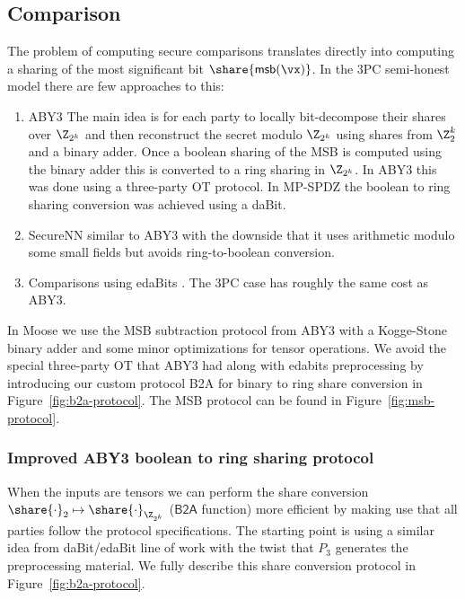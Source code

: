 \subsection{Comparison}


The problem of computing secure comparisons translates directly into computing a sharing of the most significant bit $\share{\mathsf{msb}(\vx)}$.
In the 3PC semi-honest model there are few approaches to this:
\begin{enumerate}
   \item ABY3 \cite{CCS:MohRin18} The main idea is for
   each party to locally bit-decompose their shares over $\Z_{2^k}$ and then
   reconstruct the secret modulo $\Z_{2^k}$ using shares from $\Z^k_2$ and a
   binary adder. Once a boolean sharing of the MSB is computed using the binary adder
   this is converted to a ring sharing in $\Z_{2^k}$.
   In ABY3 this was done using a three-party OT protocol. In MP-SPDZ \cite{CCS:Keller20} 
   the boolean to ring sharing conversion was achieved using a daBit.
   \item SecureNN \cite{PoPETS:WagGupCha19} 
   similar to ABY3 with the downside that it uses arithmetic modulo
   some small fields but avoids ring-to-boolean conversion.
  \item Comparisons using edaBits \cite{C:EGKRS20}. The 3PC case has roughly the same cost as ABY3.
\end{enumerate}

In Moose we use the MSB subtraction protocol from ABY3 with a Kogge-Stone binary adder and
some minor optimizations for tensor operations. 
We avoid the special three-party OT that ABY3 had along with edabits preprocessing by introducing
our custom protocol \textsf{B2A} for binary to ring share conversion in Figure~\ref{fig:b2a-protocol}.
The MSB protocol can be found in Figure~\ref{fig:msb-protocol}.


\subsubsection{Improved ABY3 boolean to ring sharing protocol}
When the inputs are tensors we can perform the share conversion $\share{\cdot}_2
\mapsto \share{\cdot}_{\Z_{2^k}}$ ($\mathsf{B2A}$ function)
more efficient by making use that all parties
follow the protocol specifications. The starting point is using a similar idea
from daBit/edaBit \cite{INDOCRYPT:RotWoo19,C:EGKRS20}
line of work with the twist that $P_3$ generates the preprocessing
material. We fully describe this share conversion protocol in Figure~\ref{fig:b2a-protocol}.

